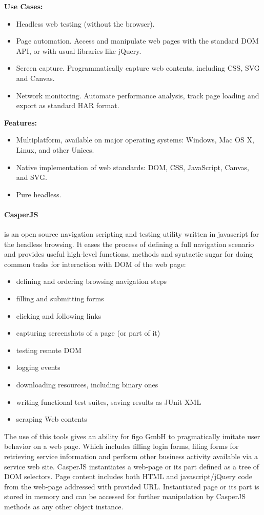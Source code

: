 \textbf{Use Cases:}
\begin{itemize}
	\item Headless web testing (without the browser).
	\item Page automation. Access and manipulate web pages with the standard DOM API, or with usual libraries like jQuery.
	\item Screen capture. Programmatically capture web contents, including CSS, SVG and Canvas.
	\item Network monitoring. Automate performance analysis, track page loading and export as standard HAR format.
\end{itemize}

\textbf{Features:}
\begin{itemize}
	\item Multiplatform, available on major operating systems: Windows, Mac OS X, Linux, and other Unices.
	\item Native implementation of web standards: DOM, CSS, JavaScript, Canvas, and SVG.
	\item Pure headless.
\end{itemize}

\paragraph{CasperJS} is an open source navigation scripting and testing utility written in javascript for the headless browsing. It eases the process of defining a full navigation scenario and provides useful high-level functions, methods and syntactic sugar for doing common tasks for interaction with DOM of the web page\cite{casperjs}:
\begin{itemize}
	\item defining and ordering browsing navigation steps
	\item filling and submitting forms
	\item clicking and following links
	\item capturing screenshots of a page (or part of it)
	\item testing remote DOM
	\item logging events
	\item downloading resources, including binary ones
	\item writing functional test suites, saving results as JUnit XML
	\item scraping Web contents
\end{itemize}

The use of this tools gives an ability for figo GmbH to pragmatically imitate user behavior on a web page. Which includes filling login forms, filing forms for retrieving service information and perform other business activity available via a service web site. CasperJS instantiates a web-page or its part defined as a tree of DOM selectors.  Page content includes both HTML and javascript/jQuery code from the web-page addressed with provided URL. Instantiated page or its part is stored in memory and can be accessed for further manipulation by CasperJS methods as any other object instance.